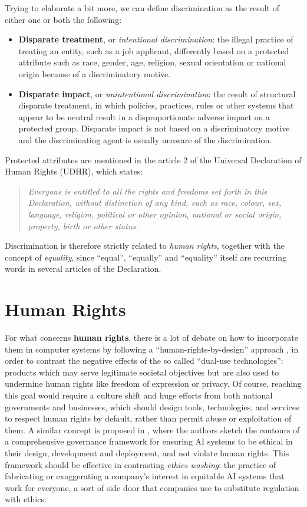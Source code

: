Trying to elaborate a bit more, we can define discrimination as the result of either one or both the following:
\begin{itemize}
\item \textbf{Disparate treatment}, or \textit{intentional discrimination}: the illegal practice of treating an entity, such as a job applicant, differently based on a protected attribute such as race, gender, age, religion, sexual orientation or national origin because of a discriminatory motive.
\item \textbf{Disparate impact}, or \textit{unintentional discrimination}: the result of structural disparate treatment, in which policies, practices, rules or other systems that appear to be neutral result in a disproportionate adverse impact on a protected group. Disparate impact is not based on a discriminatory motive and the discriminating agent is usually unaware of the discrimination.
\end{itemize}

Protected attributes are mentioned in the article 2 of the Universal Declaration of Human Rights (UDHR), which states:
\begin{quote}\emph{Everyone is entitled to all the rights and freedoms set forth in this Declaration, without distinction of any kind, such as race, colour, sex, language, religion, political or other opinion, national or social origin, property, birth or other status.} \cite{assembly1948universal}\end{quote}
Discrimination is therefore strictly related to \textit{human rights}, together with the concept of \textit{equality}, since ``equal'', ``equally'' and ``equality'' itself are recurring words in several articles of the Declaration.


\section{Human Rights}
For what concerns \textbf{human rights}, there is a lot of debate on how to incorporate them in computer systems by following a ``human-rights-by-design'' approach \cite{penney2018advancing}, in order to contrast the negative effects of the so called ``dual-use technologies'': products which may serve legitimate societal objectives but are also used to undermine human rights like freedom of expression or privacy. Of course, reaching this goal would require a culture shift and huge efforts from both national governments and businesses, which should design tools, technologies, and services to respect human rights by default, rather than permit abuse or exploitation of them.
A similar concept is proposed in \cite{yeung2020ai}, where the authors sketch the contours of a comprehensive governance framework for ensuring AI systems to be ethical in their design, development and deployment, and not violate human rights. This framework should be effective in contrasting \textit{ethics washing}: the practice of fabricating or exaggerating a company's interest in equitable AI systems that work for everyone, a sort of side door that companies use to substitute regulation with ethics.


